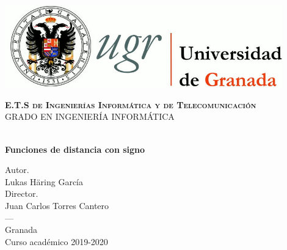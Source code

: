 \begin{titlepage}
\newlength{\centeroffset}
\setlength{\centeroffset}{-0.5\oddsidemargin}
\addtolength{\centeroffset}{0.5\evensidemargin}
\thispagestyle{empty}

\noindent\hspace*{\centeroffset}

	\includegraphics[width=0.9\textwidth]{logos/logo_ugr.jpg}\\[1.4cm]

	\begin{addmargin}[2.56cm]{0cm}
		\begin{minipage}{\textwidth}
			\textsc{\bfseries E.T.S de Ingenierías Informática y de Telecomunicación}\\
			
			\textsc{GRADO EN INGENIERÍA INFORMÁTICA}
			
			\vspace{3.0cm}
			
			\\[0.5cm]
			\begingroup
				\LARGE{\bfseries Funciones de distancia con signo}\\\bigskip
			\endgroup
	
			\vspace{3.0cm}
			
			\large{Autor.\\ Lukas Häring García}\\[0.4cm]
			\large{Director.\\ Juan Carlos Torres Cantero}\\[2cm]
			\textsc{---}\\
			Granada\\
			Curso académico 2019-2020
		\end{minipage}
	\end{addmargin}

\end{titlepage}